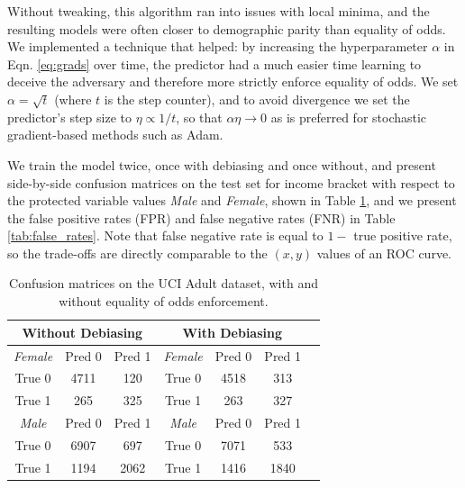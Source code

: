 \documentclass[letterpaper]{article} %
\theoremstyle{definition}
\begin{document}
Without tweaking, this algorithm ran into issues with local minima, and the resulting models were often closer to demographic parity than equality of odds.
We implemented a technique that helped: by increasing the hyperparameter $\alpha$ in Eqn. \ref{eq:grads} over time, the predictor had a much easier time learning to deceive the adversary and therefore more strictly enforce equality of odds. We set $\alpha=\sqrt{t}$ (where $t$ is the step counter), and to avoid divergence we set the predictor's step size to $\eta \propto 1/t$, so that $\alpha \eta \rightarrow 0$ as is preferred for stochastic gradient-based methods such as Adam. 

We train the model twice, once with debiasing and once without, and present side-by-side confusion matrices on the test set for income bracket with respect to the protected variable values {\it Male} and {\it Female}, shown in Table \ref{table:adult}, and we present the false positive rates (FPR) and false negative rates (FNR) in Table \ref{tab:false_rates}.  Note that false negative rate is equal to $1 -{}$ true positive rate, so the trade-offs are directly comparable to the $(x,y)$ values of an ROC curve.

\begin{table}[h!tb]
    \begin{center}
    \begin{tabular}{|c|c|c|c|c|c|c|}
    \hline
    \multicolumn{3}{|c|}{Without Debiasing} & \multicolumn{3}{|c|}{With Debiasing}   \\
    \hline
    \it Female & Pred 0 & Pred 1 & \it Female & Pred 0 & Pred 1  \\
    \hline
    True 0 & 4711 & 120 & True 0 & 4518 & 313  \\
    \hline
    True 1 & 265 & 325 & True 1 & 263 & 327  \\
    \hline
    \it Male & Pred 0 & Pred 1 & \it Male & Pred 0 & Pred 1  \\
    \hline
    True 0 & 6907 & 697 & True 0 & 7071 & 533  \\
    \hline
    True 1 & 1194 & 2062 & True 1 & 1416 & 1840  \\
    \hline
    \end{tabular}
    \caption{Confusion matrices on the UCI Adult dataset, with and without equality  of odds enforcement.}
    \label{table:adult}
    \end{center}
\end{table}
\end{document}
